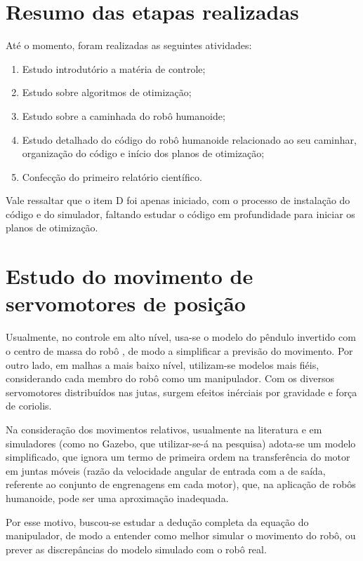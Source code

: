 \section{Resumo das etapas realizadas}

Até o momento, foram realizadas as seguintes atividades:

\begin{enumerate}[A]
\item{Estudo introdutório a matéria de controle;}
\item{Estudo sobre algoritmos de otimização;}
\item{Estudo sobre a caminhada do robô humanoide;}
\item{Estudo detalhado do código do robô humanoide relacionado ao seu caminhar, organização do código e início dos planos de otimização;}
\item{Confecção do primeiro relatório científico.}
\end{enumerate}

Vale ressaltar que o item D foi apenas iniciado, com o processo de instalação do código e do simulador, faltando estudar o código em profundidade para iniciar os planos de otimização.

\section{Estudo do movimento de servomotores de posição}

Usualmente, no controle em alto nível, usa-se o modelo do pêndulo invertido com o centro de massa do robô \cite{kajita2001}, de modo a simplificar a previsão do movimento. Por outro lado, em malhas a mais baixo nível, utilizam-se modelos mais fiéis, considerando cada membro do robô como um manipulador. Com os diversos servomotores distribuídos nas jutas, surgem efeitos inérciais por gravidade e força de coriolis.

Na consideração dos movimentos relativos, usualmente na literatura e em simuladores (como no Gazebo, que utilizar-se-á na pesquisa) adota-se um modelo simplificado, que ignora um termo de primeira ordem na transferência do motor em juntas móveis (razão da velocidade angular de entrada com a de saída, referente ao conjunto de engrenagens em cada motor), que, na aplicação de robôs humanoide, pode ser uma aproximação inadequada.

Por esse motivo, buscou-se estudar a dedução completa da equação do manipulador, de modo a entender como melhor simular o movimento do robô, ou prever as discrepâncias do modelo simulado com o robô real.

